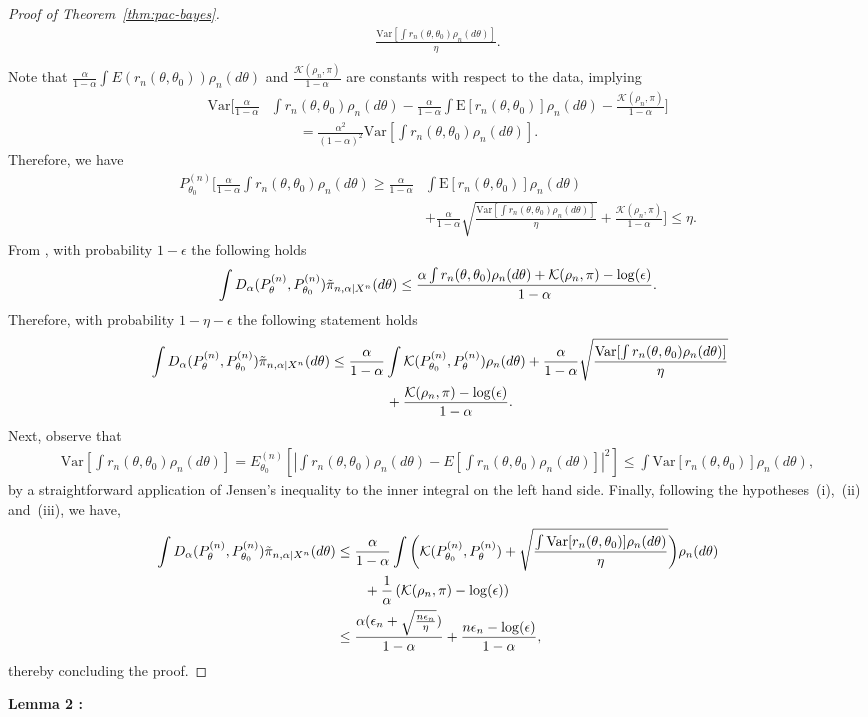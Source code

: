 \documentclass[11pt]{amsart}
\newcommand{\E}{\mathrm{E}}
\newcommand{\Var}{\mathrm{Var}}
\newcommand{\loglik}{r_n(\theta,\theta_0)}
\newcommand{\malpharen}{D_{\alpha}(P^{(n)}_{\theta},P^{(n)}_{\theta_0})}
\newcommand{\kld}{ \mathcal{K}(P^{(n)}_{\theta_0},P^{(n)}_{\theta})}
\begin{document}
\begin{proof}[Proof of Theorem~\ref{thm:pac-bayes}]
\begin{align*}
{ \frac{\Var[\int \loglik \rho_n(d\theta)]}{\eta} }. \\
 \end{align*}
 Note that $\frac{\alpha}{1-\alpha}\int E(\loglik)\rho_n(d\theta)$ and $\frac{\mathcal{K}(\rho_n,\pi)}{1-\alpha}$ are constants with respect to the data, implying
 \begin{align*}
    \Var\bigg[ \frac{\alpha}{1-\alpha} &\int \loglik\rho_n(d\theta) -  \frac{\alpha}{1-\alpha}\int \E[\loglik]\rho_n(d\theta) - \frac{\mathcal{K}(\rho_n,\pi)}{1-\alpha}\bigg]
    \\& \qquad= \frac{\alpha^2}{(1-\alpha)^2}
 {\Var\left[\int \loglik \rho_n(d\theta)\right]}.
\end{align*}
Therefore, we have
\begin{align*}
    P_{\theta_0}^{(n)}\bigg[ \frac{\alpha}{1-\alpha} \int \loglik\rho_n(d\theta) \geq  \frac{\alpha}{1-\alpha}&\int \E[\loglik]\rho_n(d\theta)\\& +\frac{\alpha}{1-\alpha} 
    \sqrt{ \frac{\Var[\int \loglik \rho_n(d\theta)]}{\eta} } +\frac{\mathcal{K}(\rho_n,\pi)}{1-\alpha} \bigg] \leq \eta.
\end{align*}
%
From , with probability $1-\epsilon$ the following holds 
%
\begin{equation*}
     \int \malpharen \Tilde{\pi}_{n,\alpha|X^n}(d\theta) \leq \frac{\alpha\int \loglik \rho_n(d\theta)+\mathcal{K}(\rho_n,\pi)-\log(\epsilon)}{1-\alpha}.
\end{equation*}
%
Therefore, with probability $1-\eta-\epsilon$ the following statement holds
%
\begin{align}~\label{eq:proof-step-miss}
    \int \malpharen \Tilde{\pi}_{n,\alpha|X^n}(d\theta) &\leq \frac{\alpha}{1-\alpha}\int \kld  \rho_n(d\theta)+\frac{\alpha}{1-\alpha} \sqrt{ \frac{\text{Var}[\int \loglik \rho_n(d\theta)]}{\eta} }\nonumber\\ & \qquad \qquad +\frac{\mathcal{K}(\rho_n,\pi)-\log(\epsilon)}{1-\alpha}.
\end{align}
Next, observe that
\begin{align*}
    \text{Var}\left[\int \loglik \rho_n(d\theta)\right] = E_{\theta_0}^{(n)} \left[ \left| \int \loglik \rho_n(d\theta) - E\left[ \int \loglik \rho_n(d\theta)\right] \right|^2 \right]\leq \int \text{Var}[\loglik ] \rho_n(d\theta),
\end{align*}
by a straightforward application of Jensen's inequality to the inner integral on the left hand side. Finally, following the hypotheses~(i),~(ii) and~(iii), we have,
\begin{align*}
    \int \malpharen \Tilde{\pi}_{n,\alpha|X^n}(d\theta) &\leq  \frac{\alpha}{1-\alpha}\int \bigg( \kld + \sqrt{ \frac{\int\Var[ \loglik ]\rho_n(d\theta)}{\eta} }\bigg)\rho_n(d\theta)\\  & \qquad  +\frac{1}{\alpha}\left(\mathcal{K}(\rho_n,\pi)-\log(\epsilon)\right)\\
    & \leq  \frac{\alpha(\epsilon_n+\sqrt{\frac{n\epsilon_n}{\eta}})}{1-\alpha}+\frac{n\epsilon_n-\log(\epsilon)}{1-\alpha}, 
\end{align*}
thereby concluding the proof.
\end{proof} 
%
\textbf{Lemma 2 :}
%
\end{document}
